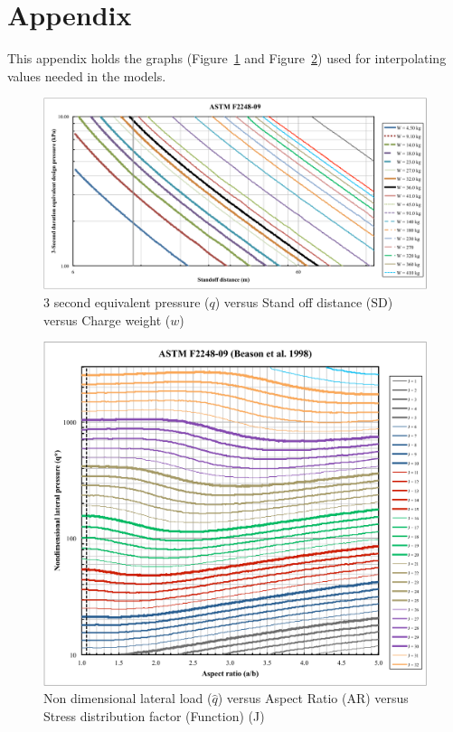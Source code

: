 \documentclass[12pt]{article}
\begin{document}
\section{Appendix}

This appendix holds the graphs (Figure~\ref{Fig_ASTM_F2248-09} and
Figure~\ref{ASTM_F2248-09_BeasonEtAl}) used for interpolating values needed in
the models.

\begin{figure}[h!]
 \begin{center}
 \includegraphics[scale=0.5]{ASTM_F2248-09.pdf}
 \caption{3 second equivalent pressure ($q$) versus Stand off distance ($\text{SD}$) versus
   Charge weight ($w$)}
\label{Fig_ASTM_F2248-09}
 \end{center}
 \end{figure}

 \begin{figure}[h!]
 \begin{center}
 \includegraphics[scale=0.7]{ASTM_F2248-09_BeasonEtAl.pdf}
 \caption{Non dimensional lateral load ($\hat{q}$) versus Aspect Ratio (AR) versus
   Stress distribution factor (Function) (J)}
\label{ASTM_F2248-09_BeasonEtAl}
 \end{center}
 \end{figure}
\end{document}
